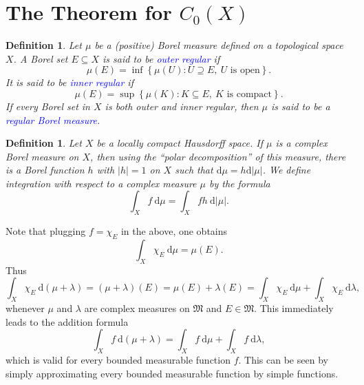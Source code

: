 \documentclass[11pt]{article}
\theoremstyle{thmstyle}
\theoremstyle{defstyle}
\newtheorem{definition}[theorem]{Definition}
\newcommand{\frakM}{\mathfrak{M}} %
\newcommand{\define}[1]{\textcolor{blue}{\textit{#1}}}
\begin{document}
\section{The Theorem for \texorpdfstring{$C_0(X)$}{C0(X)}}

\begin{definition}
    Let $\mu$ be a (positive) Borel measure defined on a topological space $X$. A Borel set $E\subseteq X$ is said to be \define{outer regular} if 
    \begin{equation*}
        \mu(E) = \inf\left\{\mu(U)\colon U\supseteq E,~U\text{ is open}\right\}.
    \end{equation*}
    It is said to be \define{inner regular} if 
    \begin{equation*}
        \mu(E) = \sup\left\{\mu(K)\colon K\subseteq E,~K\text{ is compact}\right\}.
    \end{equation*}
    If every Borel set in $X$ is both outer and inner regular, then $\mu$ is said to be a \define{regular Borel measure}.
\end{definition}

\begin{definition}
    Let $X$ be a locally compact Hausdorff space. If $\mu$ is a complex Borel measure on $X$, then using the ``polar decomposition'' of this measure, there is a Borel function $h$ with $|h| = 1$ on $X$ such that $\mathrm d\mu = h\mathrm d|\mu|$. We define \emph{integration with respect to a complex measure} $\mu$ by the formula 
    \begin{equation*}
        \int_X f~\mathrm d\mu = \int_X fh~\mathrm d|\mu|.
    \end{equation*}
\end{definition}

Note that plugging $f = \chi_E$ in the above, one obtains 
\begin{equation*}
    \int_X \chi_E~\mathrm d\mu = \mu(E).
\end{equation*}
Thus 
\begin{equation*}
    \int_X \chi_E~\mathrm d(\mu + \lambda) = (\mu + \lambda)(E) = \mu(E) + \lambda(E) = \int_X \chi_E~\mathrm d\mu + \int_X \chi_E~\mathrm d\lambda,
\end{equation*}
whenever $\mu$ and $\lambda$ are complex measures on $\frakM$ and $E\in\frakM$. This immediately leads to the addition formula 
\begin{equation*}
    \int_X f~\mathrm d(\mu + \lambda) = \int_X f~\mathrm d\mu + \int_X f~\mathrm d\lambda,
\end{equation*}
which is valid for every bounded measurable function $f$. This can be seen by simply approximating every bounded measurable function by simple functions.
\end{document}
